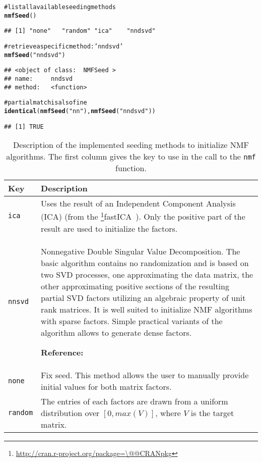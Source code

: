 \documentclass[a4paper]{article}\usepackage{graphicx, color}
\makeatletter
\newcommand{\hlfunctioncall}[1]{\textcolor[rgb]{0.501960784313725,0,0.329411764705882}{\textbf{#1}}}%
\newcommand{\hlstring}[1]{\textcolor[rgb]{0.6,0.6,1}{#1}}%
\newcommand{\hlcomment}[1]{\textcolor[rgb]{0.180392156862745,0.6,0.341176470588235}{#1}}%
\newenvironment{kframe}{%
 \def\at@end@of@kframe{}%
 \ifinner\ifhmode%
  \def\at@end@of@kframe{\end{minipage}}%
  \begin{minipage}{\columnwidth}%
 \fi\fi%
 \def\FrameCommand##1{\hskip\@totalleftmargin \hskip-\fboxsep
 \colorbox{shadecolor}{##1}\hskip-\fboxsep
     \hskip-\linewidth \hskip-\@totalleftmargin \hskip\columnwidth}%
 \MakeFramed {\advance\hsize-\width
   \@totalleftmargin\z@ \linewidth\hsize
   \@setminipage}}%
 {\par\unskip\endMakeFramed%
 \at@end@of@kframe}
\newenvironment{knitrout}{}{} %
\let\code=\texttt
\newcommand{\pkgname}[1]{\textit{#1}\xspace}
\newcommand{\CRANurl}[1]{\url{http://cran.r-project.org/package=#1}}
\def\CRANpkg{\@ifstar\@CRANpkg\@@CRANpkg}
\def\@CRANpkg#1{\href{http://cran.r-project.org/package=#1}{\pkgname{#1}}\footnote{\CRANurl{#1}}}
\def\@@CRANpkg#1{\href{http://cran.r-project.org/package=#1}{\pkgname{#1}} package\footnote{\CRANurl{#1}}}
\newcommand{\citeCRANpkg}[1]{\CRANpkg{#1}~\cite{#1}}
\renewcommand{\cite}[1]{\parencite{#1}}
\makeatother
\begin{document}
\begin{knitrout}
\color{fgcolor}\begin{kframe}
\begin{alltt}
\hlcomment{# list all available seeding methods}
\hlfunctioncall{nmfSeed}()
\end{alltt}
\begin{verbatim}
## [1] "none"   "random" "ica"    "nndsvd"
\end{verbatim}
\begin{alltt}
\hlcomment{# retrieve a specific method: \hlstring{'nndsvd'}}
\hlfunctioncall{nmfSeed}(\hlstring{"nndsvd"})
\end{alltt}
\begin{verbatim}
## <object of class:  NMFSeed >
## name:	 nndsvd 
## method:	 <function>
\end{verbatim}
\begin{alltt}
\hlcomment{# partial match is also fine}
\hlfunctioncall{identical}(\hlfunctioncall{nmfSeed}(\hlstring{"nn"}), \hlfunctioncall{nmfSeed}(\hlstring{"nndsvd"}))
\end{alltt}
\begin{verbatim}
## [1] TRUE
\end{verbatim}
\end{kframe}
\end{knitrout}


\begin{table}[h!t]
\begin{tabularx}{\textwidth}{lX}
\hline
Key & Description\\
\hline
\code{ica} & Uses the result of an Independent Component Analysis (ICA) (from
the \citeCRANpkg{fastICA}).
Only the positive part of the result are used to initialize the factors.\\
\hline
%
\code{nnsvd} & Nonnegative Double Singular Value Decomposition.
The basic algorithm contains no randomization and is based on two SVD processes, one approximating the data matrix, the other approximating positive sections of the resulting partial SVD factors utilizing an algebraic property of unit rank matrices. 
It is well suited to initialize NMF algorithms with sparse factors. Simple practical variants of the algorithm allows to generate dense factors.

\textbf{Reference:} \cite{Boutsidis2008}\\
\hline
%
\code{none} & Fix seed.
This method allows the user to manually provide initial values for both matrix factors.\\ 
\hline
%
\code{random} & The entries of each factors are drawn from a uniform distribution over $[0, max(V)]$, where $V$ is the target matrix.\\
\hline
\end{tabularx}
\caption{Description of the implemented seeding methods to initialize NMF algorithms.
The first column gives the key to use in the call to the \texttt{nmf} function.\label{tab:seed}}
\end{table}
\end{document}
